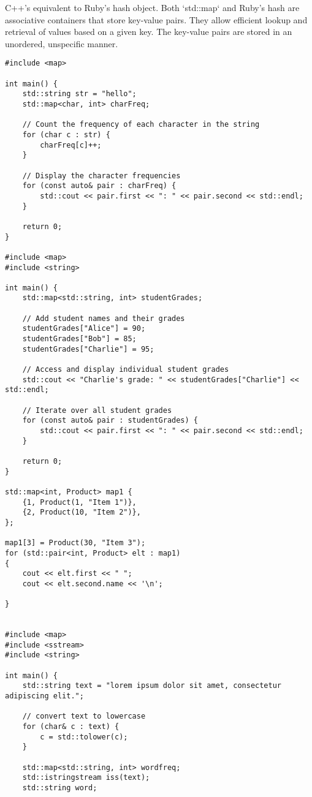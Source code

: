C++'s equivalent to Ruby's hash object. 
Both `std::map` and Ruby's hash are associative containers that store key-value pairs.
They allow efficient lookup and retrieval of values based on a given key.
The key-value pairs are stored in an unordered, unspecific manner.

\begin{verbatim}
#include <map>

int main() {
    std::string str = "hello";
    std::map<char, int> charFreq;

    // Count the frequency of each character in the string
    for (char c : str) {
        charFreq[c]++;
    }

    // Display the character frequencies
    for (const auto& pair : charFreq) {
        std::cout << pair.first << ": " << pair.second << std::endl;
    }

    return 0;
}

#include <map>
#include <string>

int main() {
    std::map<std::string, int> studentGrades;

    // Add student names and their grades
    studentGrades["Alice"] = 90;
    studentGrades["Bob"] = 85;
    studentGrades["Charlie"] = 95;

    // Access and display individual student grades
    std::cout << "Charlie's grade: " << studentGrades["Charlie"] << std::endl;

    // Iterate over all student grades
    for (const auto& pair : studentGrades) {
        std::cout << pair.first << ": " << pair.second << std::endl;
    }

    return 0;
}

std::map<int, Product> map1 {
    {1, Product(1, "Item 1")},
    {2, Product(10, "Item 2")},
};

map1[3] = Product(30, "Item 3");
for (std::pair<int, Product> elt : map1)
{
    cout << elt.first << " ";
    cout << elt.second.name << '\n';

}


#include <map>
#include <sstream>
#include <string>

int main() {
    std::string text = "lorem ipsum dolor sit amet, consectetur adipiscing elit.";

    // convert text to lowercase
    for (char& c : text) {
        c = std::tolower(c);
    }

    std::map<std::string, int> wordfreq;
    std::istringstream iss(text);
    std::string word;


\end{verbatim}
